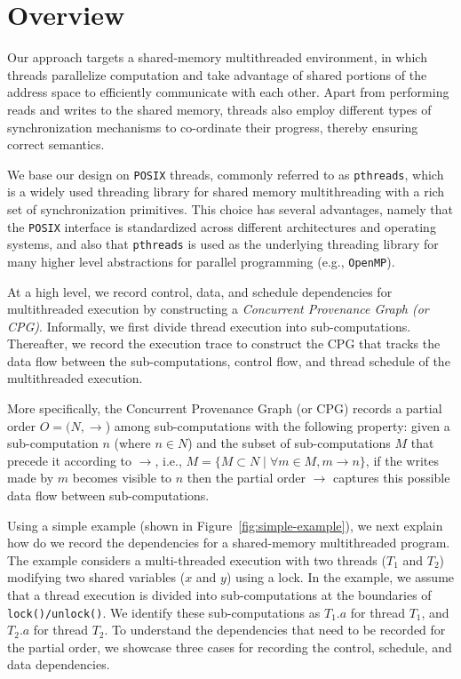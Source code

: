 \section{Overview}
\label{sec:overview}

Our approach targets a shared-memory multithreaded environment, in which threads parallelize computation and take 
advantage of shared portions of the address space to efficiently communicate with each other. Apart from performing reads 
and writes to the shared memory, threads also employ different types of synchronization mechanisms to 
co-ordinate their progress, thereby ensuring correct semantics. 

We base our design on {\tt POSIX} threads, commonly referred to as
{\tt pthreads}, which is a widely used threading library for shared memory
multithreading with a rich set of synchronization primitives.  This
choice has several advantages, namely that the {\tt POSIX} interface
is standardized across different architectures and operating systems, and also that {\tt pthreads} is used as the underlying threading
library for many higher level abstractions for parallel programming
(e.g., {\tt OpenMP}).

 At a high level, we record control, data, and schedule dependencies for multithreaded execution by constructing a {\em Concurrent Provenance Graph (or CPG)}. Informally, we first divide thread execution into sub-computations. Thereafter, we record the execution trace to construct the CPG that tracks the data flow between the sub-computations, control flow, and thread schedule  of the multithreaded execution.

More specifically, the Concurrent Provenance Graph (or CPG) records a partial order $O = (N, \rightarrow$) among sub-computations with the following property: given a sub-computation $n$ (where $n \in N $)  and the subset of sub-computations $M$ that precede it according to $\rightarrow$, i.e., $M = \{M \subset N \mid \forall m \in M, m \rightarrow n\}$, if the writes made by $m$ becomes visible to $n$ then the partial order $\rightarrow$ captures this possible data flow between sub-computations.




 Using a simple example (shown in Figure~\ref{fig:simple-example}), we next explain how do we record the dependencies for a shared-memory multithreaded program. The example considers a multi-threaded execution with two threads ($T_1$ and $T_2$) modifying two shared variables ($x$ and $y$) using a lock. In the example, we assume that a thread execution is divided into sub-computations at the boundaries of {\tt lock()/unlock()}. We identify these sub-computations as $T_1.a$ for thread $T_1$, and $T_2.a$ for thread $T_2$.   To understand the dependencies that need to be recorded for the partial order, we showcase three cases for recording the control, schedule, and data dependencies.

